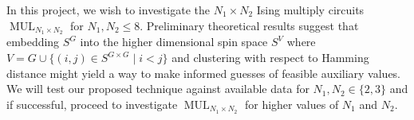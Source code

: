 \begin{homework}[e]
  In this project, we wish to investigate the $N_1\times N_2$ Ising multiply circuits $\operatorname{MUL}_{N_1\times N_2}$ for $N_1, N_2 \leq 8$. Preliminary theoretical results suggest that embedding $S^G$ into the higher dimensional spin space $S^V$ where $V = G \cup \{(i,j) \in S^{G\times G}\mid i < j\}$ and clustering with respect to Hamming distance might yield a way to make informed guesses of feasible auxiliary values. We will test our proposed technique against available data for $N_1,N_2 \in \{2,3\}$ and if successful, proceed to investigate $\operatorname{MUL}_{N_1\times N_2}$ for higher values of $N_{1}$ and $N_2$.
\end{homework}
\newpage
\begin{verbatim}  
\end{verbatim}

